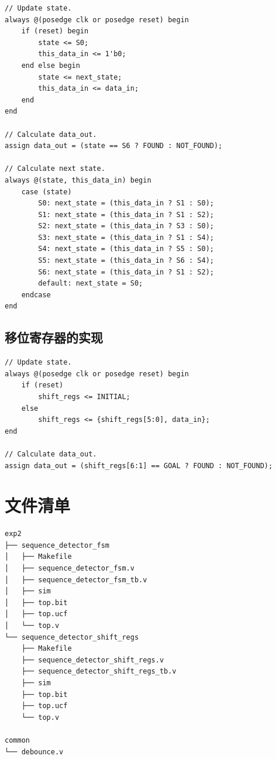 \documentclass[11pt,a4paper]{article}
\begin{document}
\begin{verbatim}
// Update state.
always @(posedge clk or posedge reset) begin
    if (reset) begin
        state <= S0;
        this_data_in <= 1'b0;
    end else begin
        state <= next_state;
        this_data_in <= data_in;
    end
end

// Calculate data_out.
assign data_out = (state == S6 ? FOUND : NOT_FOUND);

// Calculate next state.
always @(state, this_data_in) begin
    case (state)
        S0: next_state = (this_data_in ? S1 : S0);
        S1: next_state = (this_data_in ? S1 : S2);
        S2: next_state = (this_data_in ? S3 : S0);
        S3: next_state = (this_data_in ? S1 : S4);
        S4: next_state = (this_data_in ? S5 : S0);
        S5: next_state = (this_data_in ? S6 : S4);
        S6: next_state = (this_data_in ? S1 : S2);
        default: next_state = S0;
    endcase
end
\end{verbatim}

\subsection{移位寄存器的实现}

\begin{verbatim}
// Update state.
always @(posedge clk or posedge reset) begin
    if (reset)
        shift_regs <= INITIAL;
    else
        shift_regs <= {shift_regs[5:0], data_in};
end

// Calculate data_out.
assign data_out = (shift_regs[6:1] == GOAL ? FOUND : NOT_FOUND);
\end{verbatim}


\section{文件清单}

\begin{Verbatim}[fontsize=\scriptsize]
exp2
├── sequence_detector_fsm
│   ├── Makefile
│   ├── sequence_detector_fsm.v
│   ├── sequence_detector_fsm_tb.v
│   ├── sim
│   ├── top.bit
│   ├── top.ucf
│   └── top.v
└── sequence_detector_shift_regs
    ├── Makefile
    ├── sequence_detector_shift_regs.v
    ├── sequence_detector_shift_regs_tb.v
    ├── sim
    ├── top.bit
    ├── top.ucf
    └── top.v

common
└── debounce.v
\end{Verbatim}
\end{document}
